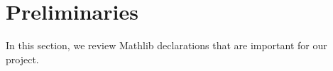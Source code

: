 \section{Preliminaries}

In this section, we review Mathlib declarations that are important for our project.

\begin{comment}
    New proposed ordering of subsections:
    \begin{enumerate}
        \item Matroids
        \item TU matrices
        \item Block matrices
        \item Types and subsets
        \item Re-typing matrix dimensions (working title)
    \end{enumerate}
\end{comment}







